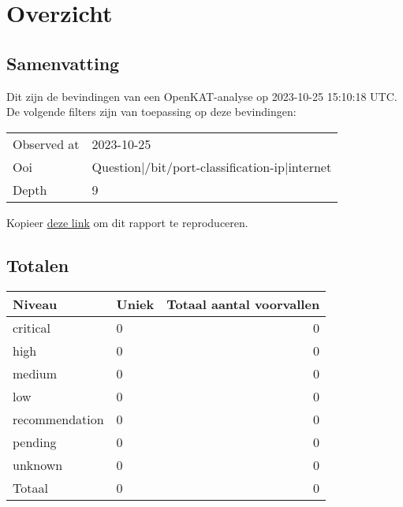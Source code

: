 \documentclass[11pt, a4paper]{report}
\begin{document}
\newpage

\chapter{Overzicht}

\section{Samenvatting}
Dit zijn de bevindingen van een OpenKAT-analyse op 2023-10-25 15:10:18 UTC. %
De volgende filters zijn van toepassing op deze bevindingen:

\begin{longtable}{ p{}  p{} }

            Observed at & 2023{-}10{-}25 \\

            Ooi & Question|/bit/port{-}classification{-}ip|internet \\

            Depth & 9 \\

\end{longtable}



    \noindent Kopieer \href{http://localhost:8000/nl/_rieven/objects/report/?observed_at=2023-10-25&depth=9&ooi_id=Question%7C%2Fbit%2Fport-classification-ip%7Cinternet}{deze link} om dit rapport te reproduceren.



\bgroup{}
\def\arraystretch{1.2}
\section{Totalen}
\begin{tabular}{ llr }
	Niveau & Uniek & Totaal aantal voorvallen \\\toprule
	\toprule

		\colorbox{box-color-critical}{ \color{color-critical} critical } & 0 & 0 \\

		\colorbox{box-color-high}{ \color{color-high} high } & 0 & 0 \\

		\colorbox{box-color-medium}{ \color{color-medium} medium } & 0 & 0 \\

		\colorbox{box-color-low}{ \color{color-low} low } & 0 & 0 \\

		\colorbox{box-color-recommendation}{ \color{color-recommendation} recommendation } & 0 & 0 \\

		\colorbox{box-color-pending}{ \color{color-pending} pending } & 0 & 0 \\

		\colorbox{box-color-unknown}{ \color{color-unknown} unknown } & 0 & 0 \\

	\bottomrule
	Totaal & 0 & 0
\end{tabular}
\egroup{}
\end{document}
